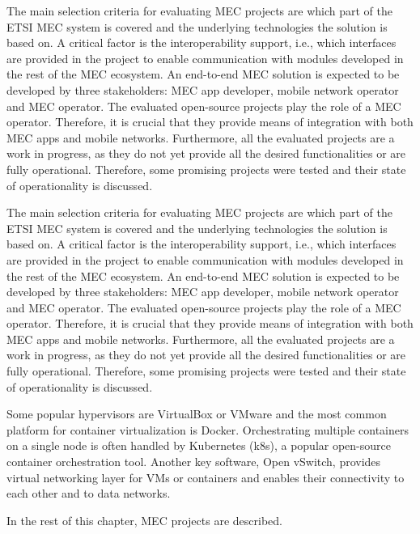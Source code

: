 \documentclass[12pt,a4paper,twoside]{report}
\begin{document}
The main selection criteria for evaluating MEC projects are which part of the ETSI MEC system is covered and the underlying technologies the solution is based on. A critical factor is the interoperability support, i.e., which interfaces are provided in the project to enable communication with modules developed in the rest of the MEC ecosystem. An end-to-end MEC solution is expected to be developed by three stakeholders: MEC app developer, mobile network operator and MEC operator. The evaluated open-source projects play the role of a MEC operator. Therefore, it is crucial that they provide means of integration with both MEC apps and mobile networks. Furthermore, all the evaluated projects are a work in progress, as they do not yet provide all the desired functionalities or are fully operational. Therefore, some promising projects were tested and their state of operationality is discussed.

The main selection criteria for evaluating MEC projects are which part of the ETSI MEC system is covered and the underlying technologies the solution is based on. A critical factor is the interoperability support, i.e., which interfaces are provided in the project to enable communication with modules developed in the rest of the MEC ecosystem. An end-to-end MEC solution is expected to be developed by three stakeholders: MEC app developer, mobile network operator and MEC operator. The evaluated open-source projects play the role of a MEC operator. Therefore, it is crucial that they provide means of integration with both MEC apps and mobile networks. Furthermore, all the evaluated projects are a work in progress, as they do not yet provide all the desired functionalities or are fully operational. Therefore, some promising projects were tested and their state of operationality is discussed.

Some popular hypervisors are VirtualBox or VMware and the most common platform for container virtualization is Docker. Orchestrating multiple containers on a single node is often handled by Kubernetes (k8s), a popular open-source container orchestration tool. Another key software, Open vSwitch, provides virtual networking layer for VMs or containers and enables their connectivity to each other and to data networks. 

In the rest of this chapter, MEC projects are described.
\end{document}
